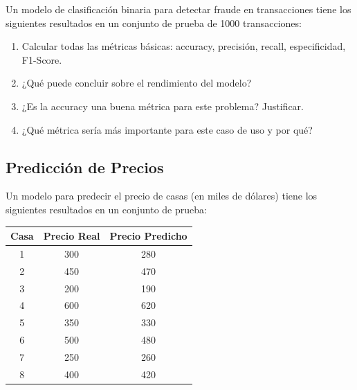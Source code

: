 \documentclass[12pt]{article}
\begin{document}
Un modelo de clasificación binaria para detectar fraude en transacciones tiene los siguientes resultados en un conjunto de prueba de 1000 transacciones:

\begin{center}
\end{center}

\begin{enumerate}
    \item[a.] Calcular todas las métricas básicas: accuracy, precisión, recall, especificidad, F1-Score.
    \item[b.] ¿Qué puede concluir sobre el rendimiento del modelo?
    \item[c.] ¿Es la accuracy una buena métrica para este problema? Justificar.
    \item[d.] ¿Qué métrica sería más importante para este caso de uso y por qué?
\end{enumerate}

\subsection{Predicción de Precios}

Un modelo para predecir el precio de casas (en miles de dólares) tiene los siguientes resultados en un conjunto de prueba:

\begin{table}[H]
    \centering
    \begin{tabular}{|c|c|c|}
        \hline
        \textbf{Casa} & \textbf{Precio Real} & \textbf{Precio Predicho} \\
        \hline
        1 & 300 & 280 \\
        2 & 450 & 470 \\
        3 & 200 & 190 \\
        4 & 600 & 620 \\
        5 & 350 & 330 \\
        6 & 500 & 480 \\
        7 & 250 & 260 \\
        8 & 400 & 420 \\
        \hline
    \end{tabular}
\end{table}
\end{document}
